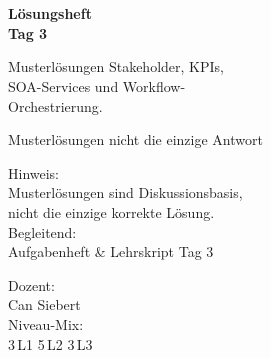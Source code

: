 \documentclass[11pt,a4paper,oneside]{article}
\begin{document}
\begin{titlepage}
  \pagestyle{empty}
  \vspace*{1.5cm}
  \\[2pt]
  \noindent{\color{lpAccent}\rule{\linewidth}{1.2pt}}\\[4pt]

  \vspace{3cm}
  {\sffamily\fontsize{30}{34}\selectfont\bfseries\color{lpInk}L\"osungsheft\\Tag 3\par}

  \vspace{0.7cm}
  {\sffamily\large\color{lpGray}Musterl\"osungen \textendash{} Stakeholder, KPIs,\\SOA-Services und Workflow-\\Orchestrierung.\par}

  \vspace{1.5cm}
  {\caveatfont\LARGE\color{lpGreen}Musterl\"osungen \textperiodcentered{} nicht die einzige Antwort}\par

  \vfill

  \noindent\begin{minipage}{0.55\linewidth}
    {\sffamily\footnotesize\color{lpGray}Hinweis:}\\
    {\sffamily\small\color{lpInk}Musterl\"osungen sind Diskussionsbasis,\\nicht die einzige korrekte L\"osung.}\\[10pt]
    {\sffamily\footnotesize\color{lpGray}Begleitend:}\\
    {\sffamily\small\color{lpInk}Aufgabenheft \& Lehrskript Tag 3}
  \end{minipage}\hfill
  \begin{minipage}{0.4\linewidth}
    \raggedleft
    {\sffamily\footnotesize\color{lpGray}Dozent:}\\
    {\sffamily\small\color{lpInk}Can Siebert}\\[10pt]
    {\sffamily\footnotesize\color{lpGray}Niveau-Mix:}\\
    {\sffamily\small\color{lpInk}3\,L1 \textperiodcentered{} 5\,L2 \textperiodcentered{} 3\,L3}
  \end{minipage}

  \vspace{0.5cm}
  \noindent{\color{lpAccent}\rule{\linewidth}{0.6pt}}
\end{titlepage}
\end{document}

